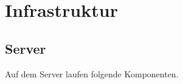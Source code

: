 \newpage

\chapter{Infrastruktur}

\section{Server}
Auf dem Server laufen folgende Komponenten. \\


